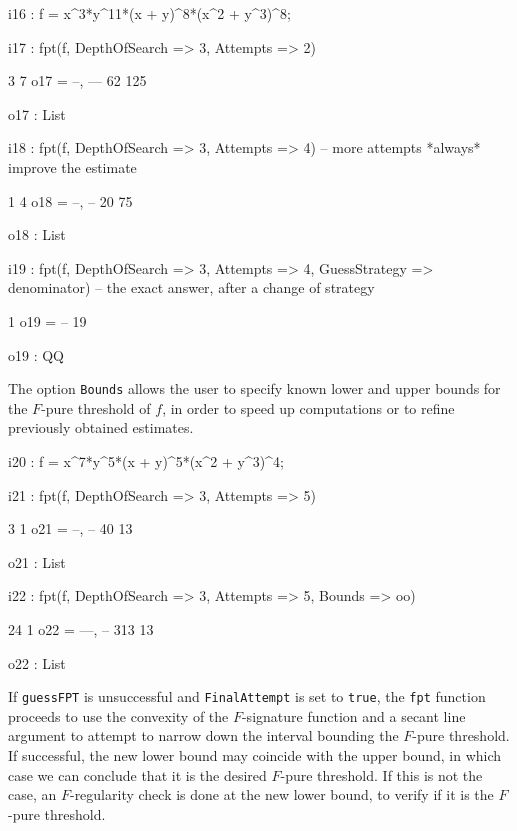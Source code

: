 \documentclass{amsart}
\begin{document}
\bigskip
{\small
{}
\begin{MyVerbatim}
i16 : f = x^3*y^11*(x + y)^8*(x^2 + y^3)^8;

i17 : fpt(f, DepthOfSearch => 3, Attempts => 2)

        3   7
o17 = {--, ---}
       62  125

o17 : List

i18 : fpt(f, DepthOfSearch => 3, Attempts => 4) -- more attempts *always*
      improve the estimate

        1   4
o18 = {--, --}
       20  75

o18 : List

i19 : fpt(f, DepthOfSearch => 3, Attempts => 4, GuessStrategy => denominator)
      -- the exact answer, after a change of strategy

       1
o19 = --
      19

o19 : QQ
\end{MyVerbatim}
}
\bigskip


The option \texttt{Bounds} allows the user to specify known lower and upper bounds for the $F$-pure threshold of $f$, in order to speed up computations or to refine previously obtained estimates.

\bigskip
{\small
{}
\begin{MyVerbatim}
i20 : f = x^7*y^5*(x + y)^5*(x^2 + y^3)^4;

i21 : fpt(f, DepthOfSearch => 3, Attempts => 5)

        3   1
o21 = {--, --}
       40  13

o21 : List

i22 : fpt(f, DepthOfSearch => 3, Attempts => 5, Bounds => oo)

        24   1
o22 = {---, --}
       313  13

o22 : List
\end{MyVerbatim}
}
\bigskip


If \texttt{guessFPT} is unsuccessful and \texttt{FinalAttempt} is set to \texttt{true}, the \texttt{fpt} function proceeds to use the convexity of the $F$-signature function and a secant line argument to attempt to narrow down the interval bounding the $F$-pure threshold.
If successful, the new lower bound may coincide with the upper bound, in which case we can conclude that it is the desired $F$-pure threshold.
If this is not the case, an $F$-regularity check is done at the new lower bound, to verify if it is the $F$-pure threshold.
\end{document}
